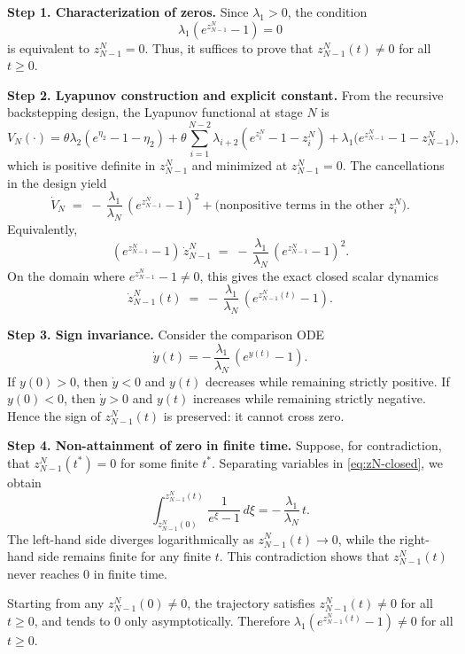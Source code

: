 \documentclass[10pt, a4paper]{amsart}
\makeatletter
\theoremstyle{plain}
\theoremstyle{definition}
\theoremstyle{remark}
\renewenvironment{proof}[1][\proofname]{\par
  \pushQED{\qed}%
  \normalfont \topsep6\p@\@plus6\p@\relax
  \trivlist
  \item[\hskip\labelsep
        \itshape
    #1\ \ref{#1}.]\ignorespaces
}{%
  \popQED\endtrivlist\@endpefalse
}
\numberwithin{equation}{section}
\def\to{\rightarrow}
\makeatother
\begin{document}
\begin{proof}
\textbf{Step 1. Characterization of zeros.}  
Since $\lambda_1>0$, the condition 
\[
\lambda_1(e^{z^N_{N-1}}-1)=0
\]
is equivalent to $z^N_{N-1}=0$. Thus, it suffices to prove that $z^N_{N-1}(t)\neq 0$ for all $t\ge 0$.

\medskip
\textbf{Step 2. Lyapunov construction and explicit constant.}  
From the recursive backstepping design, the Lyapunov functional at stage $N$ is
\[%
V_{N}(\cdot)=\theta \lambda_2(e^{\eta_{2}}-1-\eta_{2})+\theta \sum_{i=1}^{N-2}\lambda_{i+2}(e^{z^N_{i}}-1-z^N_{i})+\lambda_1\big(e^{z^N_{N-1}}-1-z^N_{N-1}\big),
\]
which is positive definite in $z^N_{N-1}$ and minimized at $z^N_{N-1}=0$.  
The cancellations in the design yield
\[
\dot V_{N} \;=\; -\,\frac{\lambda_1}{\lambda_{N}}\,(e^{z^N_{N-1}}-1)^2 
+ \text{(nonpositive terms in the other $z^N_i$)}.
\]
Equivalently,
\[
(e^{z^N_{N-1}}-1)\,\dot z^N_{N-1} \;=\; -\,\frac{\lambda_1}{\lambda_{N}}\,(e^{z^N_{N-1}}-1)^2.
\]
On the domain where $e^{z^N_{N-1}}-1\neq 0$, this gives the exact closed scalar dynamics
\begin{equation}\label{eq:zN-closed}
\dot z^N_{N-1}(t) \;=\; -\,\frac{\lambda_1}{\lambda_{N}}\,(e^{z^N_{N-1}(t)}-1).
\end{equation}

\medskip
\textbf{Step 3. Sign invariance.}  
Consider the comparison ODE
\[
\dot y(t) = -\,\frac{\lambda_1}{\lambda_{N}}\,(e^{y(t)}-1).
\]
If $y(0)>0$, then $\dot y<0$ and $y(t)$ decreases while remaining strictly positive.  
If $y(0)<0$, then $\dot y>0$ and $y(t)$ increases while remaining strictly negative.  
Hence the sign of $z^N_{N-1}(t)$ is preserved: it cannot cross zero.

\medskip
\textbf{Step 4. Non-attainment of zero in finite time.}  
Suppose, for contradiction, that $z^N_{N-1}(t^\ast)=0$ for some finite $t^\ast$.  
Separating variables in \eqref{eq:zN-closed}, we obtain
\[
\int_{z^N_{N-1}(0)}^{z^N_{N-1}(t)} \frac{1}{e^{\xi}-1}\,d\xi
= -\,\frac{\lambda_1}{\lambda_{N}}\,t.
\]
The left-hand side diverges logarithmically as $z^N_{N-1}(t)\to 0$, while the right-hand side remains finite for any finite $t$.  
This contradiction shows that $z^N_{N-1}(t)$ never reaches $0$ in finite time.

\medskip  
Starting from any $z^N_{N-1}(0)\neq 0$, the trajectory satisfies $z^N_{N-1}(t)\neq 0$ for all $t\ge 0$, and tends to $0$ only asymptotically.  
Therefore $\lambda_1(e^{z^N_{N-1}(t)}-1)\neq 0$ for all $t\ge 0$.
\end{proof}
\end{document}
